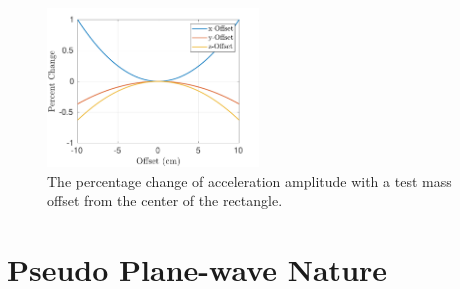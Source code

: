 \documentclass[superscriptaddress, twocolumn, prd]{revtex4-1}
\begin{document}
\begin{figure}[!h]
\centering \includegraphics[width=0.5\textwidth]{Super4_Offset.pdf}
\caption{The percentage change of acceleration amplitude with a test mass offset from the center of the rectangle.}
\label{offset} 
\end{figure}


\section{Pseudo Plane-wave Nature}
\end{document}
